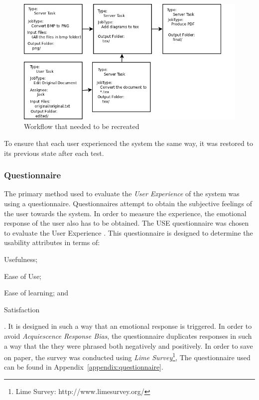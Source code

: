 \begin{figure}[!h]
    \begin{center}
        \includegraphics[scale=0.45]{figures/workflow.png}
    \end{center}
    \caption{Workflow that needed to be recreated}
    \label{eval:workflow}
\end{figure}
To ensure that each user experienced the system the same way, it was restored to
its previous state after each test.

\subsubsection{Questionnaire}
The primary method used to evaluate the \emph{User Experience} of the system was
using a questionnaire. Questionnaires attempt
to obtain the subjective feelings of the user towards the
system\cite{Chin:1988:DIM:57167.57203}. In order to measure the experience, the
emotional response of the user also has to be obtained. The USE questionnaire
was chosen to evaluate the User Experience \cite{lund2001measuring}. This
questionnaire is designed to determine the usability attributes in terms of:
\begin{inparaenum}[(i)]\item Usefulness;\item Ease of Use; \item Ease of learning; and \item
Satisfaction \end{inparaenum}. It is designed in such a way that an
emotional response is triggered. In order to avoid \emph{Acquiescence Response Bias},
the questionnaire duplicates responses in such a way that the they were
phrased both negatively and positively.
In order to save on paper, the survey was conducted using \emph{Lime
Survey}\footnote{Lime Survey: http://www.limesurvey.org/},
The questionnaire used can be found in Appendix~\ref{appendix:questionnaire}.

